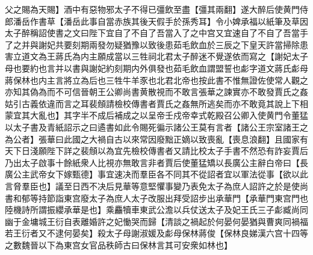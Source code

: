 父之賜為天賜】酒中有惡物邪太子不得已彊飲至盡【彊其兩翻】遂大醉后使黄門侍郎潘岳作書草【潘岳此事自當赤族其後天假手於孫秀耳】令小婢承福以紙筆及草因太子醉稱詔使書之文曰陛下宜自了不自了吾當入了之中宫又宜速自了不自了吾當手了之并與謝妃共要刻期兩發勿疑猶豫以致後患茹毛飲血於三辰之下皇天許當掃除患害立道文為王蔣氏為内主願成當以三牲祠北君太子醉迷不覺遂依而寫之【謝妃太子母也要約也言并以書與謝妃約刻期内外俱發也茹毛飲血謂盟誓也虨字道文蔣氏虨母蔣保林也内主言將立為后也三牲牛羊豕也北君北帝也按此書不惟無證佐使常人觀之亦知其偽為而不可信晉朝王公卿尚書黄散視而不敢言張華之諫實亦不敢發賈氏之姦姑引古義依違而言之耳裴頠請檢校傳書者賈氏之姦無所逃矣而亦不敢竟其說上下相蒙宜其大亂也】其字半不成后補成之以呈帝壬戍帝幸式乾殿召公卿入使黄門令董猛以太子書及青紙詔示之曰遹書如此令賜死徧示諸公王莫有言者【諸公王宗室諸王之為公者】張華曰此國之大禍自古以來常因廢黜正嫡以致喪亂【喪息浪翻】且國家有天下日淺願陛下詳之裴頠以為宜先檢校傳書者又請比校太子手書不然恐有詐妄賈后乃出太子啟事十餘紙衆人比視亦無敢言非者賈后使董猛矯以長廣公主辭白帝曰【長廣公主武帝女下嫁甄德】事宜速决而羣臣各不同其不從詔者宜以軍法從事【欲以此言脅羣臣也】議至日西不决后見華等意堅懼事變乃表免太子為庶人詔許之於是使尚書和郁等持節詣東宫廢太子為庶人太子改服出拜受詔步出承華門【承華門東宫門也陸機詩所謂振纓承華是也】乘麤犢車東武公澹以兵仗送太子及妃王氏三子虨臧尚同幽于金墉城王衍自表離婚許之妃慟哭而歸【清談之禍起於何晏何晏猶與曹爽同禍福若王衍者又不逮何晏矣】殺太子母謝淑媛及虨母保林蔣俊【保林良娣漢六宫十四等之數魏晉以下為東宫女官品秩師古曰保林言其可安衆如林也】

